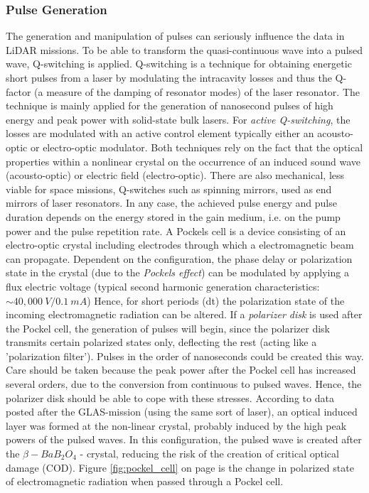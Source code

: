 \subsubsection{Pulse Generation}
\label{pockel}
The generation and manipulation of pulses can seriously influence the data in \acs{LiDAR} missions. To be able to transform the quasi-continuous wave into a pulsed wave, Q-switching is applied. Q-switching is a technique for obtaining energetic short pulses from a \acs{laser} by modulating the intracavity losses and thus the Q-factor (a measure of the damping of resonator modes) of the laser resonator. The technique is mainly applied for the generation of nanosecond pulses of high energy and peak power with solid-state bulk lasers. For \textit{active Q-switching}, the losses are modulated with an active control element typically either an acousto-optic or electro-optic modulator. Both techniques rely on the fact that the optical properties within a nonlinear crystal on the occurrence of an induced sound wave (acousto-optic) or electric field (electro-optic). There are also mechanical, less viable for space missions, Q-switches such as spinning mirrors, used as end mirrors of laser resonators. In any case, the achieved pulse energy and pulse duration depends on the energy stored in the gain medium, i.e. on the pump power and the pulse repetition rate.  A Pockels cell is a device consisting of an electro-optic crystal including electrodes through which a electromagnetic beam can propagate. Dependent on the configuration, the phase delay or polarization state in the crystal (due to the \textit{Pockels effect}) can be modulated by applying a flux electric voltage (typical second harmonic generation characteristics: $\sim40,000\ V / 0.1\ mA$)  Hence, for short periods (dt) the polarization state of the incoming electromagnetic radiation can be altered. If a \textit{polarizer disk} is used after the Pockel cell, the generation of pulses will begin, since the polarizer disk transmits certain polarized states only, deflecting the rest (acting like a 'polarization filter'). Pulses in the order of nanoseconds could be created this way. Care should be taken because the peak power after the Pockel cell has increased several orders, due to the conversion from continuous to pulsed waves. Hence, the polarizer disk should be able to cope with these stresses. According to data posted after the GLAS-mission (using the same sort of \acs{laser}), an optical induced layer was formed at the non-linear crystal, probably induced by the high peak powers of the pulsed waves. In this configuration, the pulsed wave is created after the $\beta-BaB_{2}O_{4}$ - crystal, reducing the risk of the creation of critical optical damage (COD). Figure \ref{fig:pockel_cell} on page \pageref{fig:pockel_cell} is the change in polarized state of electromagnetic radiation when passed through a Pockel cell.

